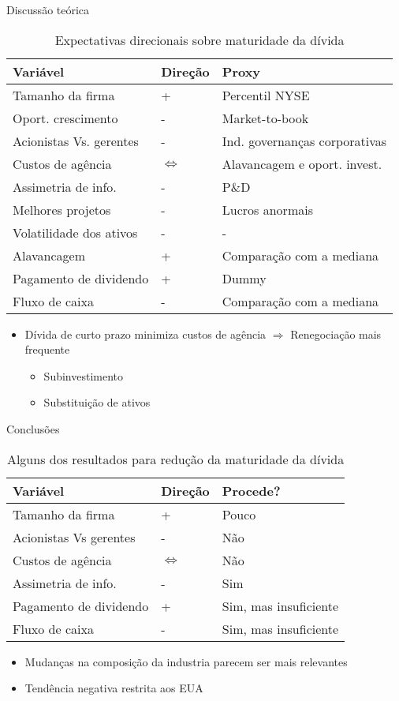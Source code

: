 \documentclass[presentation]{beamer}
\begin{document}
\begin{frame}[label={sec:org7cf5288}]{Discussão teórica}
\begin{table}[htbp]
\caption{Expectativas direcionais sobre maturidade da dívida}
\centering
\begin{tabular}{lll}
\hline
Variável & Direção & Proxy\\
\hline
Tamanho da firma & + & Percentil NYSE\\
Oport. crescimento & - & Market-to-book\\
Acionistas Vs. gerentes & - & Ind. governanças corporativas\\
Custos de agência & \(\Leftrightarrow\) & Alavancagem e oport. invest.\\
Assimetria de info. & - & P\&D\\
Melhores projetos & - & Lucros anormais\\
Volatilidade dos ativos & - & -\\
Alavancagem & + & Comparação com a mediana\\
Pagamento de dividendo & + & Dummy\\
Fluxo de caixa & - & Comparação com a mediana\\
\hline
\end{tabular}
\end{table}


\begin{itemize}
\item Dívida de curto prazo minimiza custos de agência \(\Rightarrow\) Renegociação mais frequente
\begin{itemize}
\item Subinvestimento
\item Substituição de ativos
\end{itemize}
\end{itemize}
\end{frame}

\begin{frame}[label={sec:orgc66c9c2}]{Conclusões}
\begin{table}[htbp]
\caption{Alguns dos resultados para redução da maturidade da dívida}
\centering
\begin{tabular}{lll}
\hline
Variável & Direção & Procede?\\
\hline
Tamanho da firma & + & Pouco\\
Acionistas Vs gerentes & - & Não\\
Custos de agência & \(\Leftrightarrow\) & Não\\
Assimetria de info. & - & Sim\\
Pagamento de dividendo & + & Sim, mas insuficiente\\
Fluxo de caixa & - & Sim, mas insuficiente\\
\hline
\end{tabular}
\end{table}


\begin{itemize}
\item Mudanças na composição da industria parecem ser mais relevantes
\item Tendência negativa restrita aos EUA
\end{itemize}
\end{frame}
\end{document}
